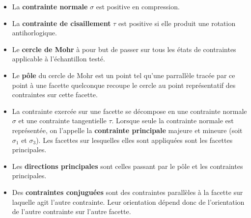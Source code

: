     \begin{itemize}
        \item La \textbf{contrainte normale} $\sigma$ est positive en compression.
        \item La \textbf{contrainte de cisaillement} $\tau$ est positive si elle produit une rotation antihorlogique.
        \item Le \textbf{cercle de Mohr} à pour but de passer sur tous les états de contraintes applicable à l'échantillon testé.
        \item Le \textbf{pôle} du cercle de Mohr est un point tel qu'une parrallèle tracée par ce point à une facette quelconque recoupe le cercle au point représentatif des contraintes sur cette facette.
        \item La contrainte exercée sur une facette se décompose en une contrainte normale $\sigma$ et une contrainte tangentielle $\tau$. Lorsque seule la contrainte normale est représentée, on l'appelle la \textbf{contrainte principale} majeure et mineure (soit $\sigma_1$ et $ \sigma_3$). Les facettes sur lesquelles elles sont appliquées sont les facettes principales.
        \item Les \textbf{directions principales} sont celles passant par le pôle et les contraintes principales.
        \item Des \textbf{contraintes conjuguées} sont des contraintes parallèles à la facette sur laquelle agit l'autre contrainte. Leur orientation dépend donc de l'orientation de l'autre contrainte sur l'autre facette. 
\end{itemize}
%
